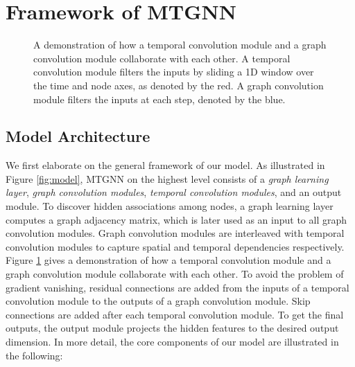 \documentclass[sigconf]{acmart}
\begin{document}
\section{Framework of MTGNN}\label{sec:met}

\begin{figure*}
	\centering
	\caption{The framework of MTGNN. A  standard convolution first projects the inputs into a latent space. Afterward, temporal convolution modules and graph convolution modules are interleaved with each other to capture temporal and spatial dependencies respectively. The hyper-parameter, dilation factor , which controls the receptive field size of a temporal convolution module, is increased at an exponential rate of . The graph learning layer learns the hidden graph adjacency matrix, which is used by graph convolution modules. Residual connections and skip connections are added to the model to avoid the problem of gradient vanishing. The output module projects hidden features to the desired dimension to get the final results.}
	\label{fig:model}
\end{figure*}


\begin{figure}
	\centering
	\caption{\small A demonstration of how a temporal convolution module and a graph convolution module collaborate with each other. A temporal convolution module filters the inputs by sliding a 1D window over the time and node axes, as denoted by the red. A graph convolution module filters the inputs at each step, denoted by the blue.}
	\label{fig:cube}
\end{figure}




\subsection{Model Architecture}
We first elaborate on the general framework of our model. As illustrated in Figure \ref{fig:model}, MTGNN on the highest level consists of a \textit{graph learning layer},  \textit{graph convolution modules},  \textit{temporal convolution modules}, and an output module. To discover hidden associations among nodes, a graph learning layer computes a graph adjacency matrix, which is later used as an input to all graph convolution modules. Graph convolution modules are interleaved with temporal convolution modules to capture spatial and temporal dependencies respectively. Figure \ref{fig:cube} gives a demonstration of how a temporal convolution module and a graph convolution module collaborate with each other. To avoid the problem of gradient vanishing, residual connections are added from the inputs of a temporal convolution module to the outputs of a graph convolution module. Skip connections are added after each temporal convolution module. To get the final outputs,  the output module projects the hidden features to the desired output dimension. In more detail, the core components of our model are illustrated in the following:
\end{document}
